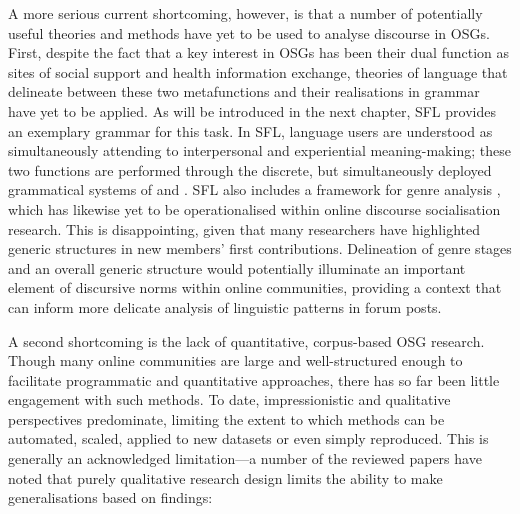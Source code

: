 A more serious current shortcoming, however, is that a number of potentially useful theories and methods have yet to be used to analyse discourse in \glspl{OSG}. First, despite the fact that a key interest in \glspl{OSG} has been their dual function as sites of social support and health information exchange, theories of language that delineate between these two metafunctions and their realisations in grammar have yet to be applied. As will be introduced in the next chapter, \gls{SFL} provides an exemplary grammar for this task. In \gls{SFL}, language users are understood as simultaneously attending to interpersonal and experiential meaning\hyp{}making; these two functions are performed through the discrete, but simultaneously deployed grammatical systems of  and  \cite{halliday_introduction:_2004}. \gls{SFL} also includes a framework for genre analysis \cite[e.g.][]{eggins_analysing_2004}, which has likewise yet to be operationalised within online discourse socialisation research. This is disappointing, given that many researchers have highlighted generic structures in new members' first contributions. Delineation of genre stages and an overall generic structure would potentially illuminate an important element of discursive norms within online communities, providing a context that can inform more delicate analysis of linguistic patterns in \gls{forum} \glspl{post}.




A second shortcoming is the lack of quantitative, corpus\hyp{}based \gls{OSG} research. Though many online communities are large and well\hyp{}structured enough to facilitate programmatic and quantitative approaches, there has so far been little engagement with such methods. To date, impressionistic and qualitative perspectives predominate, limiting the extent to which methods can be automated, scaled, applied to new datasets or even simply reproduced. This is generally an acknowledged limitation---a number of the reviewed papers have noted that purely qualitative research design limits the ability to make generalisations based on findings:

